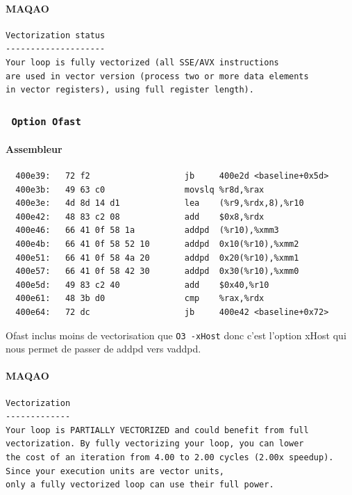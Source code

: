 \documentclass{report}
\begin{document}
      \paragraph{MAQAO}
        \begin{tcolorbox}
          \begin{verbatim}
Vectorization status
--------------------
Your loop is fully vectorized (all SSE/AVX instructions
are used in vector version (process two or more data elements
in vector registers), using full register length).
        \end{verbatim}
      \end{tcolorbox}
      \subsubsection{ \texttt{ Option Ofast } }
        \paragraph{Assembleur}
          \begin{tcolorbox}
            \begin{verbatim}
  400e39:	72 f2                	jb     400e2d <baseline+0x5d>
  400e3b:	49 63 c0             	movslq %r8d,%rax
  400e3e:	4d 8d 14 d1          	lea    (%r9,%rdx,8),%r10
  400e42:	48 83 c2 08          	add    $0x8,%rdx
  400e46:	66 41 0f 58 1a       	addpd  (%r10),%xmm3
  400e4b:	66 41 0f 58 52 10    	addpd  0x10(%r10),%xmm2
  400e51:	66 41 0f 58 4a 20    	addpd  0x20(%r10),%xmm1
  400e57:	66 41 0f 58 42 30    	addpd  0x30(%r10),%xmm0
  400e5d:	49 83 c2 40          	add    $0x40,%r10
  400e61:	48 3b d0             	cmp    %rax,%rdx
  400e64:	72 dc                	jb     400e42 <baseline+0x72>
          \end{verbatim}
        \end{tcolorbox}
          Ofast inclus moins de vectorisation que \texttt{O3 -xHost} donc c'est l'option xHost
          qui nous permet de passer de addpd vers vaddpd.
        \paragraph{MAQAO}
        \begin{tcolorbox}
          \begin{verbatim}
Vectorization
-------------
Your loop is PARTIALLY VECTORIZED and could benefit from full
vectorization. By fully vectorizing your loop, you can lower
the cost of an iteration from 4.00 to 2.00 cycles (2.00x speedup).
Since your execution units are vector units,
only a fully vectorized loop can use their full power.
        \end{verbatim}
      \end{tcolorbox}
\end{document}
